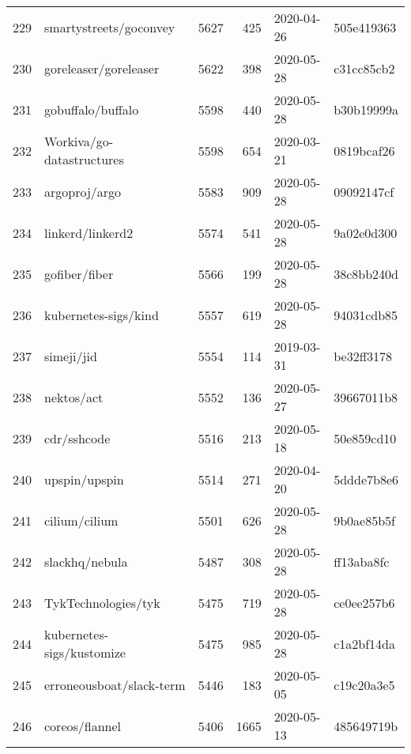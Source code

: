 \begin{longtable}{llrrll}
    229 &                             smartystreets/goconvey &   5627 &    425 & 2020-04-26 &  505e419363 \\
    230 &                              goreleaser/goreleaser &   5622 &    398 & 2020-05-28 &  c31cc85cb2 \\
    231 &                                  gobuffalo/buffalo &   5598 &    440 & 2020-05-28 &  b30b19999a \\
    232 &                          Workiva/go-datastructures &   5598 &    654 & 2020-03-21 &  0819bcaf26 \\
    233 &                                      argoproj/argo &   5583 &    909 & 2020-05-28 &  09092147cf \\
    234 &                                   linkerd/linkerd2 &   5574 &    541 & 2020-05-28 &  9a02e0d300 \\
    235 &                                      gofiber/fiber &   5566 &    199 & 2020-05-28 &  38c8bb240d \\
    236 &                               kubernetes-sigs/kind &   5557 &    619 & 2020-05-28 &  94031cdb85 \\
    237 &                                         simeji/jid &   5554 &    114 & 2019-03-31 &  be32ff3178 \\
    238 &                                         nektos/act &   5552 &    136 & 2020-05-27 &  39667011b8 \\
    239 &                                        cdr/sshcode &   5516 &    213 & 2020-05-18 &  50e859cd10 \\
    240 &                                      upspin/upspin &   5514 &    271 & 2020-04-20 &  5ddde7b8e6 \\
    241 &                                      cilium/cilium &   5501 &    626 & 2020-05-28 &  9b0ae85b5f \\
    242 &                                     slackhq/nebula &   5487 &    308 & 2020-05-28 &  ff13aba8fc \\
    243 &                                TykTechnologies/tyk &   5475 &    719 & 2020-05-28 &  ce0ee257b6 \\
    244 &                          kubernetes-sigs/kustomize &   5475 &    985 & 2020-05-28 &  c1a2bf14da \\
    245 &                           erroneousboat/slack-term &   5446 &    183 & 2020-05-05 &  c19c20a3e5 \\
    246 &                                     coreos/flannel &   5406 &   1665 & 2020-05-13 &  485649719b \\

\end{longtable}
